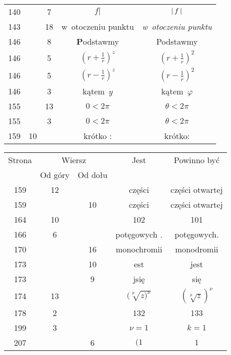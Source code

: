 \documentclass[a4paper,11pt]{article}
\begin{document}
\begin{center}
\begin{tabular}{|c|c|c|c|c|}
    140 & & \hphantom{0}7 & $f |$ & $|\, {  f  } \,|$ \\
    143 & & 18 & w~otoczeniu punktu & \textit{w~otoczeniu punktu} \\
    146 & & \hphantom{0}8 & \textbf{P}odstawmy & Podstawmy \\
    146 & & \hphantom{0}5 & $( r + \frac{ 1 }{ r } )^{ z }$
           & $( r + \frac{ 1 }{ r } )^{ 2 }$ \\
    146 & & \hphantom{0}5 & $( r - \frac{ 1 }{ r } )^{ z }$
           & $( r - \frac{ 1 }{ r } )^{ 2 }$ \\
    146 & & \hphantom{0}3 & kątem~$y$ & kątem~$\varphi$ \\
    155 & & 13 & $0 < 2\pi$ & $\theta < 2\pi$ \\
    155 & & \hphantom{0}3 & $0 < 2\pi$ & $\theta < 2\pi$ \\
    159 & 10 & & krótko : & krótko: \\
    \hline
  \end{tabular}





  \newpage

  \begin{tabular}{|c|c|c|c|c|}
    \hline
    Strona & \multicolumn{2}{c|}{Wiersz} & Jest
                              & Powinno być \\ \cline{2-3}
    & Od góry & Od dołu & & \\
    \hline
    159 & 12 & & części & części otwartej \\
    159 & & 10 & części & części otwartej \\
    164 & 10 & & 102 & 101 \\
    166 & \hphantom{0}6 & & potęgowych . & potęgowych. \\
    170 & & 16 & monochromii & monodromii \\
    173 & & 10 & est & jest \\
    173 & & \hphantom{0}9 & jsię & się \\
    174 & 13 & & $( \sqrt[p]{ z )^{ \nu } }$ & $( \sqrt[p]{ z } )^{ \nu }$ \\
    178 & \hphantom{0}2 & & 132 & 133 \\
    199 & \hphantom{0}3 & & $\nu = 1$ & $k = 1$ \\
    207 & & \hphantom{0}6 & $( 1$ & $1$ \\
    \hline
  \end{tabular}

\end{center}
\end{document}
